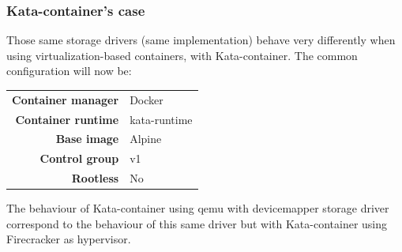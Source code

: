 \clearpage
\subsubsection{Kata-container's case}
Those same storage drivers (same implementation) behave very differently when using virtualization-based containers, with Kata-container.  The common configuration will now be:

\begin{tabular}{rl}
   \textbf{Container manager} & Docker \\
   \textbf{Container runtime} & kata-runtime \\
   \textbf{Base image} & Alpine \\
   \textbf{Control group} & v1 \\
   \textbf{Rootless} & No 
\end{tabular}

The behaviour of Kata-container using qemu with devicemapper storage driver correspond to the behaviour of this same driver but with Kata-container using Firecracker as hypervisor.

